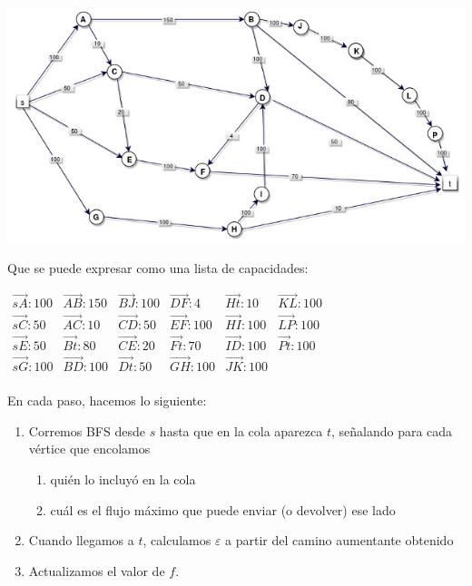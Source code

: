 \documentclass[10pt,a4paper]{article}
\begin{document}
\begin{center}

    \begin{adjustbox}{max size={\textwidth}{\textheight}}
        \includegraphics{definitions/EK1.jpg}
        \end{adjustbox}
    
\end{center}

Que se puede expresar como una lista de capacidades:

\begin{center}
$\begin{array}{llllll} \overrightarrow{sA}: 100& \overrightarrow{AB}: 150&\overrightarrow{BJ}: 100&\overrightarrow{DF}: 4&\overrightarrow{Ht}: 10&\overrightarrow{KL}: 100\\ \overrightarrow{sC}: 50& \overrightarrow{AC}: 10&\overrightarrow{CD}: 50&\overrightarrow{EF}: 100&\overrightarrow{HI}: 100&\overrightarrow{LP}: 100\\ \overrightarrow{sE}: 50& \overrightarrow{Bt}: 80&\overrightarrow{CE}: 20&\overrightarrow{Ft}: 70&\overrightarrow{ID}: 100&\overrightarrow{Pt}: 100\\ \overrightarrow{sG}: 100& \overrightarrow{BD}: 100&\overrightarrow{Dt}: 50&\overrightarrow{GH}: 100&\overrightarrow{JK}: 100&\\ \end{array}$
\end{center}

En cada paso, hacemos lo siguiente:

\begin{enumerate}

	\item Corremos BFS desde $s$ hasta que en la cola aparezca $t$, señalando para cada vértice que encolamos

	\begin{enumerate}

		\item quién lo incluyó en la cola
		\item cuál es el flujo máximo que puede enviar (o devolver) ese lado
	\end{enumerate}
	
	\item Cuando llegamos a $t$, calculamos $\varepsilon$ a partir del camino aumentante obtenido
	\item Actualizamos el valor de $f$.
\end{enumerate}
\end{document}
